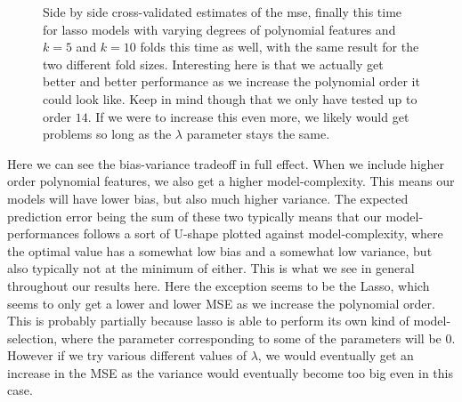 \documentclass{article}
\begin{document}
\begin{figure}
    \centering
    \quad
    \caption{Side by side cross-validated estimates of the mse, finally this time for lasso models with varying degrees of polynomial features and $k=5$ and
        $k=10$ folds this time as well, with the same result for the two
        different fold sizes. Interesting here is that we actually get better
        and better performance as we increase the polynomial order it could look
        like. Keep in mind though that we only have tested up to order $14$. If
        we were to increase this even more, we likely would get problems so long
        as the $\lambda$ parameter stays the same.}
    \label{crossval-lasso}
\end{figure}

Here we can see the bias-variance tradeoff in full effect. When we include
higher order polynomial features, we also get a higher model-complexity. This
means our models will have lower bias, but also much higher variance. The
expected prediction error being the sum of these two typically means that our
model-performances follows a sort of U-shape plotted against model-complexity,
where the optimal value has a somewhat low bias and a somewhat low variance, but
also typically not at the minimum of either. This is what we see in general
throughout our results here. Here the exception seems to be the Lasso, which
seems to only get a lower and lower MSE as we increase the polynomial order.
This is probably partially because lasso is able to perform its own kind of
model-selection, where the parameter corresponding to some of the parameters
will be $0$. However if we try various different values of $\lambda$, we would
eventually get an increase in the MSE as the variance would eventually become
too big even in this case.
\end{document}
